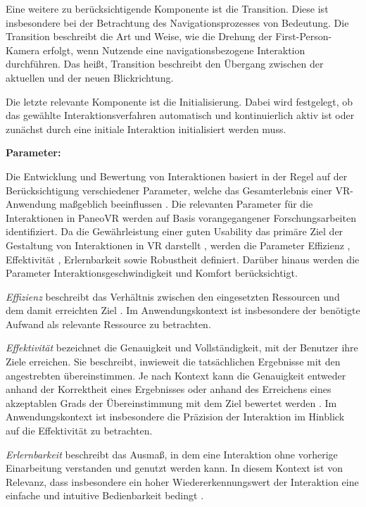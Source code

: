Eine weitere zu berücksichtigende Komponente ist die Transition. Diese ist insbesondere bei der Betrachtung des Navigationsprozesses von Bedeutung. Die Transition beschreibt die Art und Weise, wie die Drehung der First-Person-Kamera erfolgt, wenn Nutzende eine navigationsbezogene Interaktion durchführen. Das heißt, Transition beschreibt den Übergang zwischen der aktuellen und der neuen Blickrichtung.

Die letzte relevante Komponente ist die Initialisierung. Dabei wird festgelegt, ob das gewählte Interaktionsverfahren automatisch und kontinuierlich aktiv ist oder zunächst durch eine initiale Interaktion initialisiert werden muss. 

{\normalfont \bfseries Parameter:} 

Die Entwicklung und Bewertung von Interaktionen basiert in der Regel auf der Berücksichtigung verschiedener Parameter, welche das Gesamterlebnis einer VR-Anwendung maßgeblich beeinflussen \citep{10.1145/3441852.3471230}. Die relevanten Parameter für die Interaktionen in PaneoVR werden auf Basis vorangegangener Forschungsarbeiten identifiziert. Da die Gewährleistung einer guten Usability das primäre Ziel der Gestaltung von Interaktionen in VR darstellt \citep{dorner_virtual_2019}, werden die Parameter Effizienz \citep{DINISO9241-11}, Effektivität \citep{DINISO9241-11}, Erlernbarkeit \citep{DINISO9241-110} sowie Robustheit \citep{DINISO9241-110} definiert. Darüber hinaus werden die Parameter Interaktionsgeschwindigkeit \citep{COOK2015117} und Komfort \citep{jerald_vr_2016} berücksichtigt. 

\textit{Effizienz} beschreibt das Verhältnis zwischen den eingesetzten Ressourcen und dem damit erreichten Ziel \citep{DINISO9241-11}. Im Anwendungskontext ist insbesondere der benötigte Aufwand als relevante Ressource zu betrachten.

\textit{Effektivität} bezeichnet die Genauigkeit und Vollständigkeit, mit der Benutzer ihre Ziele erreichen. Sie beschreibt, inwieweit die tatsächlichen Ergebnisse mit den angestrebten übereinstimmen. Je nach Kontext kann die Genauigkeit entweder anhand der Korrektheit eines Ergebnisses oder anhand des Erreichens eines akzeptablen Grads der Übereinstimmung mit dem Ziel bewertet werden \citep{DINISO9241-11}. Im Anwendungskontext ist insbesondere die Präzision der Interaktion im Hinblick auf die Effektivität zu betrachten. 

\textit{Erlernbarkeit} beschreibt das Ausmaß, in dem eine Interaktion ohne vorherige Einarbeitung verstanden und genutzt werden kann. In diesem Kontext ist von Relevanz, dass insbesondere ein hoher Wiedererkennungswert der Interaktion eine einfache und intuitive Bedienbarkeit bedingt \citep{jerald_vr_2016}.

